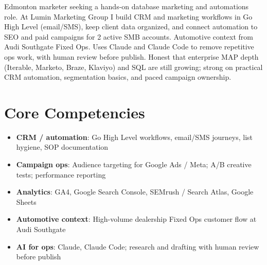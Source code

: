\documentclass[11pt,a4paper,sans]{moderncv}
\begin{document}
\makecvtitle

\vspace{6pt}
\small{Edmonton marketer seeking a hands-on database marketing and automations role. At Lumin Marketing Group I build CRM and marketing workflows in Go High Level (email/SMS), keep client data organized, and connect automation to SEO and paid campaigns for 2 active SMB accounts. Automotive context from Audi Southgate Fixed Ops. Uses Claude and Claude Code to remove repetitive ops work, with human review before publish. Honest that enterprise MAP depth (Iterable, Marketo, Braze, Klaviyo) and SQL are still growing; strong on practical CRM automation, segmentation basics, and paced campaign ownership.}

\section{Core Competencies}
\vspace{1pt}
\begin{itemize}
\item \textbf{CRM / automation}: Go High Level workflows, email/SMS journeys, list hygiene, SOP documentation
\item \textbf{Campaign ops}: Audience targeting for Google Ads / Meta; A/B creative tests; performance reporting
\item \textbf{Analytics}: GA4, Google Search Console, SEMrush / Search Atlas, Google Sheets
\item \textbf{Automotive context}: High-volume dealership Fixed Ops customer flow at Audi Southgate
\item \textbf{AI for ops}: Claude, Claude Code; research and drafting with human review before publish
\end{itemize}
\end{document}
